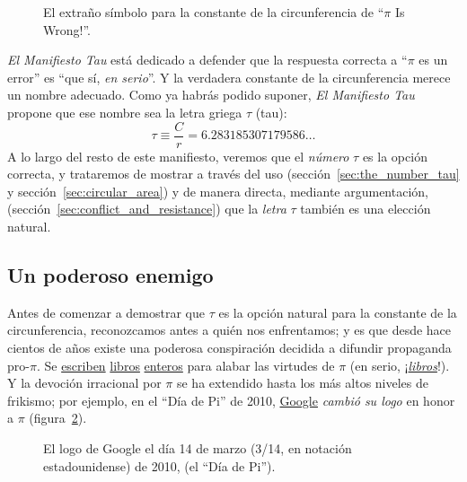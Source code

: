 \begin{figure}
\caption{El extraño símbolo para la constante de la circunferencia de ``$\pi$ Is Wrong!''.\label{fig:palais_tau}}
\end{figure}

\emph{El Manifiesto Tau} está dedicado a defender que la respuesta correcta a ``$\pi$ es un error'' es ``que sí, \emph{en serio}''. Y la verdadera constante de la circunferencia merece un nombre adecuado. Como ya habrás podido suponer, \emph{El Manifiesto Tau} propone que ese nombre sea la letra griega $\tau$ (tau):
\begin{equation}
\label{eq:tau}
\tau \equiv \frac{C}{r} = 6.283185307179586\ldots
\end{equation}
A lo largo del resto de este manifiesto, veremos que el \emph{número} $\tau$ es la opción correcta, y trataremos de mostrar a través del uso (sección~\ref{sec:the_number_tau} y sección~\ref{sec:circular_area}) y de manera directa, mediante argumentación, (sección~\ref{sec:conflict_and_resistance}) que la  \emph{letra} $\tau$ también es una elección natural.

\subsection{Un poderoso enemigo} %
 \label{sec:a_powerful_enemy}

Antes de comenzar a demostrar que $\tau$ es la opción natural para la constante de la circunferencia, reconozcamos antes a quién nos enfrentamos; y es que desde hace cientos de años existe una poderosa conspiración decidida a difundir propaganda pro-$\pi$. Se \href{http://www.amazon.com/exec/obidos/ISBN=0802713327/parallaxproductiA/}{escriben} \href{http://www.amazon.com/Pi-Sky-Counting-Thinking-Being/dp/0198539568}{libros} \href{http://www.amazon.com/exec/obidos/ISBN=0312381859/parallaxproductiA/}{enteros} para alabar las virtudes de $\pi$ (en serio, ¡\href{http://www.amazon.com/exec/obidos/ISBN=0387989463/parallaxproductiA/}{\emph{libros}}!). Y la devoción irracional por  $\pi$ se ha extendido hasta los más altos niveles de frikismo; por ejemplo, en el ``Día de Pi'' de 2010, \href{http://www.google.com/}{Google} \emph{cambió su logo} en honor a $\pi$ (figura~\ref{fig:google_pi_day.}).

\begin{figure}
\begin{center}
\end{center}
\caption{El logo de Google el día 14 de marzo (3/14, en notación estadounidense)
de 2010, (el ``Día de Pi'').\label{fig:google_pi_day.}}
\end{figure}


